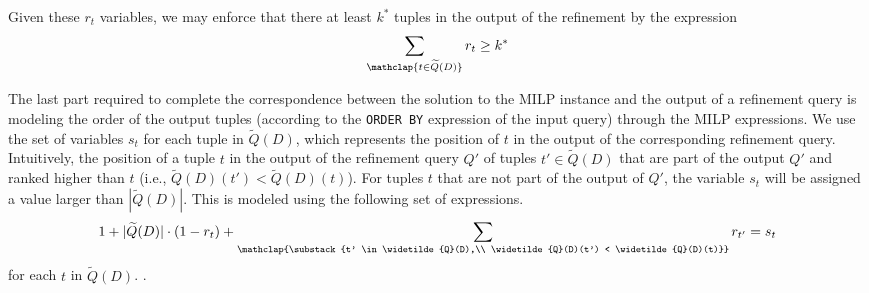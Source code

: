 


Given these $r_t$ variables, we may enforce that there at least $k^*$  tuples in the output of the refinement by the expression
\begin{align}
    \sum_{\mathclap{t \in \widetilde{Q}(D)}} r_{t} \geq k^* \label{eq:at_least_k_star_inline}
\end{align}

The last part required to complete the correspondence between the solution to the MILP instance and the output of a refinement query is modeling the order of the output tuples (according to the {\tt ORDER BY} expression of the input query) through the MILP expressions. We use the set of variables $s_t$ for each tuple in $\widetilde{Q}(D)$, which represents the position of $t$ in the output of the corresponding refinement query. Intuitively, the position of a tuple $t$ in the output of the refinement query $Q'$  of tuples $t'\in \widetilde{Q}(D)$ that are part of the output $Q'$ and ranked higher than $t$ (i.e., $\widetilde{Q}(D)(t') < \widetilde{Q}(D)(t)$). For tuples $t$ that are not part of the output of $Q'$, the variable $s_t$ will be assigned a value larger than $|\widetilde{Q}(D)|$. This is modeled using the following set of expressions.
\begin{align}
    1 + |\widetilde{Q}(D)| \cdot (1 - r_t) + \sum_{\mathclap{\substack{t' \in \widetilde{Q}(D),\\ \widetilde{Q}(D)(t') < \widetilde{Q}(D)(t)}}} r_{t'} = s_{t} \label{eq:position_in_ranking_inline}
\end{align}
for each $t$ in $\widetilde{Q}(D)$. .

